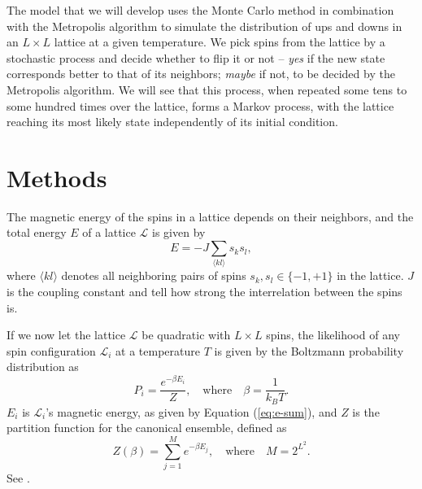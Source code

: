 \documentclass[]{article}
\begin{document}
The model that we will develop uses the Monte Carlo method in combination with the Metropolis algorithm to simulate the distribution of ups and downs in an $L \times L$ lattice at a given temperature. We pick spins from the lattice by a stochastic process and decide whether to flip it or not -- \textit{yes} if the new state corresponds better to that of its neighbors; \textit{maybe} if not, to be decided by the Metropolis algorithm. We will see that this process, when repeated some tens to some hundred times over the lattice, forms a Markov process, with the lattice reaching its most likely state independently of its initial condition.



\section{Methods} \label{methods}


The magnetic energy of the spins in a lattice depends on their neighbors, and the total energy $E$ of a lattice $\mathcal{L}$ is given by
\begin{equation} \label{eq:e-sum}
	E = -J \sum_{\langle kl \rangle} s_k s_l,
\end{equation}
where $\langle kl \rangle$ denotes all neighboring pairs of spins $s_k, s_l \in \{ -1, +1\}$ in the lattice. $J$ is the coupling constant and tell how strong the interrelation between the spins is.

If we now let the lattice $\mathcal{L}$ be quadratic with $L \times L$ spins, the likelihood of any spin configuration $\mathcal{L}_i$ at a temperature $T$ is given by the Boltzmann probability distribution as
\begin{equation} \label{eq:pi}
	P_i = \frac{e^{-\beta E_i}}{Z}, \quad \text{where} \quad \beta = \frac{1}{k_BT}.
\end{equation}
$E_i$ is $\mathcal{L}_i$'s magnetic energy, as given by Equation (\ref{eq:e-sum}), and $Z$ is the partition function for the canonical ensemble, defined as
\begin{equation}
	Z(\beta) = \sum_{j=1}^{M} e^{-\beta E_j}, \quad \text{where} \quad M = 2^{L^2}.
\end{equation}
See \cite{fys-stk4155-notes}.
\end{document}
